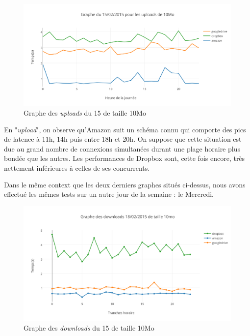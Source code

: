 \documentclass[10pt]{article}
\begin{document}
\begin{figure}[h] \centering
\includegraphics[scale=0.7]{graphe_du_15022015_pour_les_uploads_de_10mo.png}
\caption{Graphe des \textit{uploads} du 15 de taille 10Mo} \end{figure}

En "\textit{upload}", on observe qu'Amazon suit un schéma connu qui comporte
des pics de latence à 11h, 14h puis entre 18h et 20h. On suppose que cette
situation est due au grand nombre de connexions simultanées durant une plage
horaire plus bondée que les autres. Les performances de Dropbox sont, cette
fois encore, très nettement inférieures à celles de ses concurrents.

Dans le même context que les deux derniers graphes situés ci-dessus, nous avons
effectué les mêmes tests sur un autre jour de la semaine : le Mercredi.

\begin{figure}[h] \centering
\includegraphics[scale=0.65]{graphe_des_downloads_18022015_de_taille_10mo.png}
\caption{Graphe des \textit{downloads} du 15 de taille 10Mo} \end{figure}
\end{document}
